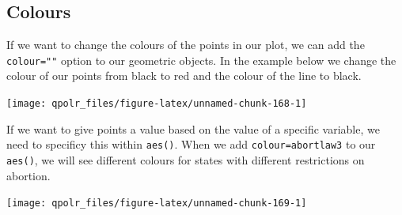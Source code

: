 \documentclass[12pt,oneside]{reedthesis}
\theoremstyle{definition}
\theoremstyle{definition}
\theoremstyle{definition}
\theoremstyle{remark}
\begin{document}
  \subsection{Colours}\label{colours}
  
  If we want to change the colours of the points in our plot, we can add
  the \texttt{colour=""} option to our geometric objects. In the example
  below we change the colour of our points from black to red and the
  colour of the line to black.
  \begin{Shaded}
  \begin{Highlighting}[]
  \NormalTok{(}\OperatorTok{+}
  \StringTok{  }\NormalTok{(}\NormalTok{) }\OperatorTok{+}\StringTok{ }
  \StringTok{  }\NormalTok{(}\NormalTok{, }\NormalTok{) }\OperatorTok{+}
  \StringTok{  }\NormalTok{()}
  \end{Highlighting}
  \end{Shaded}
  \begin{center}\texttt{[image: qpolr\_files/figure-latex/unnamed-chunk-168-1]} \end{center}
  
  If we want to give points a value based on the value of a specific
  variable, we need to specificy this within \texttt{aes()}. When we add
  \texttt{colour=abortlaw3} to our \texttt{aes()}, we will see different
  colours for states with different restrictions on abortion.
  \begin{Shaded}
  \begin{Highlighting}[]
  \NormalTok{(}\OperatorTok{+}
  \StringTok{  }\NormalTok{(}\NormalTok{(}\OperatorTok{+}\StringTok{ }
  \StringTok{  }\NormalTok{(}\NormalTok{, }\NormalTok{) }\OperatorTok{+}
  \StringTok{  }\NormalTok{()}
  \end{Highlighting}
  \end{Shaded}
  \begin{center}\texttt{[image: qpolr\_files/figure-latex/unnamed-chunk-169-1]} \end{center}
  
\end{document}

